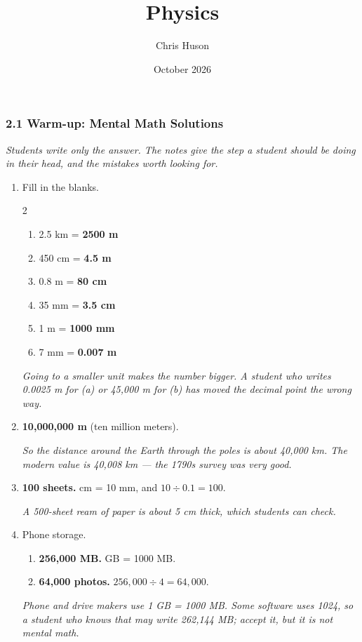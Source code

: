 \documentclass[12pt, twoside]{article}
\title{Physics}
\author{Chris Huson}
\date{October 2026}
\begin{document}
\subsubsection*{2.1 Warm-up: Mental Math Solutions}

\emph{Students write only the answer. The notes give the step a student should be
doing in their head, and the mistakes worth looking for.}

\begin{enumerate}[itemsep=0.45cm]

\item Fill in the blanks.
  \begin{multicols}{2}
    \begin{enumerate}[itemsep=0.2cm]
      \item 2.5 km = \textbf{2500 m}
      \item 450 cm = \textbf{4.5 m}
      \item 0.8 m = \textbf{80 cm}
      \item 35 mm = \textbf{3.5 cm}
      \item 1 m = \textbf{1000 mm}
      \item 7 mm = \textbf{0.007 m}
    \end{enumerate}
  \end{multicols}
  \emph{Going to a smaller unit makes the number bigger. A student who writes
  0.0025 m for (a) or 45{,}000 m for (b) has moved the decimal point the wrong way.}

\item \textbf{10{,}000{,}000 m} (ten million meters).

  \emph{So the distance around the Earth through the poles is about 40{,}000 km. The
  modern value is 40{,}008 km --- the 1790s survey was very good.}

\item \textbf{100 sheets.}  cm = 10 mm, and $10 \div 0.1 = 100$.

  \emph{A 500-sheet ream of paper is about 5 cm thick, which students can check.}

\item Phone storage.
  \begin{enumerate}[itemsep=0.2cm]
    \item \textbf{256{,}000 MB.}  GB = 1000 MB.
    \item \textbf{64{,}000 photos.} \quad $256{,}000 \div 4 = 64{,}000$.
  \end{enumerate}
  \emph{Phone and drive makers use 1 GB = 1000 MB. Some software uses 1024, so a
  student who knows that may write 262{,}144 MB; accept it, but it is not mental math.}


\end{enumerate}
\end{document}
